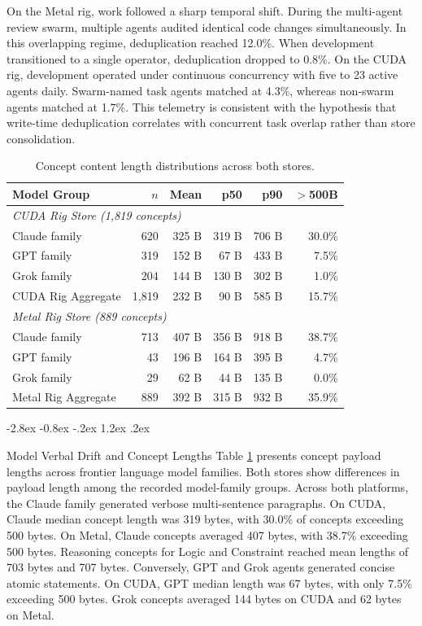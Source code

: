 \documentclass[10pt,twocolumn]{article}
\makeatletter
\renewcommand\subsection{\@startsection{subsection}{2}{\z@}%
  {-2.8ex \@plus -0.8ex \@minus -.2ex}%
  {1.2ex \@plus .2ex}%
  {\normalfont\normalsize\bfseries\raggedright}}
\makeatother
\begin{document}
On the Metal rig, work followed a sharp temporal shift.
During the multi-agent review swarm, multiple agents audited identical code changes simultaneously.
In this overlapping regime, deduplication reached 12.0\%.
When development transitioned to a single operator, deduplication dropped to 0.8\%.
On the CUDA rig, development operated under continuous concurrency with five to 23 active agents daily.
Swarm-named task agents matched at 4.3\%, whereas non-swarm agents matched at 1.7\%.
This telemetry is consistent with the hypothesis that write-time deduplication correlates with concurrent task overlap rather than store consolidation.

\begin{table}[t]
\centering
\caption{Concept content length distributions across both stores.}
\label{tab:length}
\scriptsize
\begin{tabular*}{\columnwidth}{@{\extracolsep{\fill}}lrrrrr@{}}
\toprule
\textbf{Model Group} & \textbf{$n$} & \textbf{Mean} & \textbf{p50} & \textbf{p90} & \textbf{$>$500B} \\
\midrule
\multicolumn{6}{l}{\textit{CUDA Rig Store (1,819 concepts)}} \\
Claude family & 620 & 325 B & 319 B & 706 B & 30.0\% \\
GPT family & 319 & 152 B & 67 B & 433 B & 7.5\% \\
Grok family & 204 & 144 B & 130 B & 302 B & 1.0\% \\
CUDA Rig Aggregate & 1,819 & 232 B & 90 B & 585 B & 15.7\% \\
\midrule
\multicolumn{6}{l}{\textit{Metal Rig Store (889 concepts)}} \\
Claude family & 713 & 407 B & 356 B & 918 B & 38.7\% \\
GPT family & 43 & 196 B & 164 B & 395 B & 4.7\% \\
Grok family & 29 & 62 B & 44 B & 135 B & 0.0\% \\
Metal Rig Aggregate & 889 & 392 B & 315 B & 932 B & 35.9\% \\
\bottomrule
\end{tabular*}
\end{table}

\subsection{Model Verbal Drift and Concept Lengths}
Table \ref{tab:length} presents concept payload lengths across frontier language model families.
Both stores show differences in payload length among the recorded model-family groups.
Across both platforms, the Claude family generated verbose multi-sentence paragraphs.
On CUDA, Claude median concept length was 319 bytes, with 30.0\% of concepts exceeding 500 bytes.
On Metal, Claude concepts averaged 407 bytes, with 38.7\% exceeding 500 bytes.
Reasoning concepts for Logic and Constraint reached mean lengths of 703 bytes and 707 bytes.
Conversely, GPT and Grok agents generated concise atomic statements.
On CUDA, GPT median length was 67 bytes, with only 7.5\% exceeding 500 bytes.
Grok concepts averaged 144 bytes on CUDA and 62 bytes on Metal.
\end{document}
